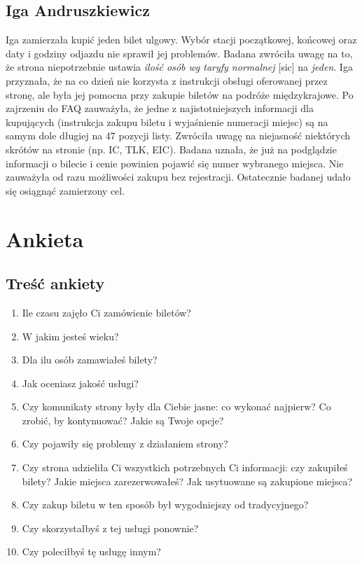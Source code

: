 \documentclass{article}
\begin{document}
\subsection{Iga Andruszkiewicz}
\label{3.3.}
Iga zamierzała kupić jeden bilet ulgowy. Wybór stacji początkowej, końcowej oraz daty i godziny odjazdu nie sprawił jej problemów.
Badana zwróciła uwagę na to, że strona niepotrzebnie ustawia \emph{ilość osób wg taryfy normalnej} [sic] na \emph{jeden}.
Iga przyznała, że na co dzień nie korzysta z instrukcji obsługi oferowanej przez stronę, ale była jej pomocna przy zakupie
biletów na podróże międzykrajowe. Po zajrzeniu do FAQ zauważyła, że jedne z najistotniejszych
informacji dla kupujących (instrukcja zakupu biletu i wyjaśnienie numeracji miejsc) są na samym dole
długiej na 47 pozycji listy. Zwróciła uwagę na niejasność niektórych skrótów na stronie (np. IC, TLK, EIC).
Badana uznała, że już na podglądzie informacji o bilecie i cenie powinien pojawić się numer wybranego miejsca.
Nie zauważyła od razu możliwości zakupu bez rejestracji. Ostatecznie badanej udało się osiągnąć zamierzony cel.

\section{Ankieta}
\label{4.}
\subsection{Treść ankiety}
\begin{enumerate}
\item Ile czasu zajęło Ci zamówienie biletów?
\item W jakim jesteś wieku?
\item Dla ilu osób zamawiałeś bilety?
\item Jak oceniasz jakość usługi?
\item Czy komunikaty strony były dla Ciebie jasne: co wykonać najpierw? Co zrobić, by kontynuować? Jakie są Twoje opcje?
\item Czy pojawiły się problemy z działaniem strony?
\item Czy strona udzieliła Ci wszystkich potrzebnych Ci informacji: czy zakupiłeś bilety? Jakie miejsca zarezerwowałeś? Jak usytuowane
są zakupione miejsca?
\item Czy zakup biletu w ten sposób był wygodniejszy od tradycyjnego?
\item Czy skorzystałbyś z tej usługi ponownie?
\item Czy poleciłbyś tę usługę innym?
\end{enumerate}
\end{document}
